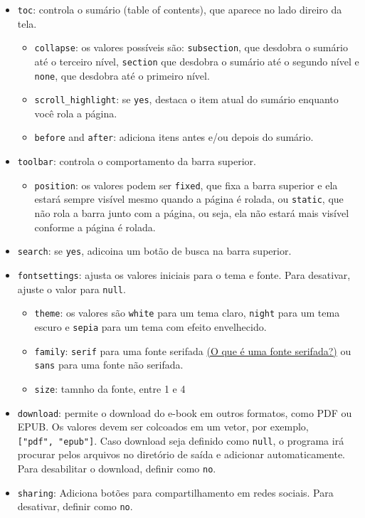\documentclass[
]{book}
\providecommand{\tightlist}{%
  \setlength{\itemsep}{0pt}\setlength{\parskip}{0pt}}
\begin{document}
\begin{itemize}
\tightlist
\item
  \texttt{toc}: controla o sumário (table of contents), que aparece no lado direiro da tela.

  \begin{itemize}
  \tightlist
  \item
    \texttt{collapse}: os valores possíveis são: \texttt{subsection}, que desdobra o sumário até o terceiro nível, \texttt{section} que desdobra o sumário até o segundo nível e \texttt{none}, que desdobra até o primeiro nível.
  \item
    \texttt{scroll\_highlight}: se \texttt{yes}, destaca o item atual do sumário enquanto você rola a página.
  \item
    \texttt{before} and \texttt{after}: adiciona itens antes e/ou depois do sumário.
  \end{itemize}
\item
  \texttt{toolbar}: controla o comportamento da barra superior.

  \begin{itemize}
  \tightlist
  \item
    \texttt{position}: os valores podem ser \texttt{fixed}, que fixa a barra superior e ela estará sempre visível mesmo quando a página é rolada, ou \texttt{static}, que não rola a barra junto com a página, ou seja, ela não estará mais visível conforme a página é rolada.
  \end{itemize}
\item
  \texttt{search}: se \texttt{yes}, adicoina um botão de busca na barra superior.
\item
  \texttt{fontsettings}: ajusta os valores iniciais para o tema e fonte. Para desativar, ajuste o valor para \texttt{null}.

  \begin{itemize}
  \tightlist
  \item
    \texttt{theme}: os valores são \texttt{white} para um tema claro, \texttt{night} para um tema escuro e \texttt{sepia} para um tema com efeito envelhecido.
  \item
    \texttt{family}: \texttt{serif} para uma fonte serifada \href{https://pt.wikipedia.org/wiki/Serifa}{(O que é uma fonte serifada?)} ou \texttt{sans} para uma fonte não serifada.
  \item
    \texttt{size}: tamnho da fonte, entre 1 e 4
  \end{itemize}
\item
  \texttt{download}: permite o download do e-book em outros formatos, como PDF ou EPUB. Os valores devem ser colcoados em um vetor, por exemplo, \texttt{{[}"pdf",\ "epub"{]}}. Caso download seja definido como \texttt{null}, o programa irá procurar pelos arquivos no diretório de saída e adicionar automaticamente. Para desabilitar o download, definir como \texttt{no}.
\item
  \texttt{sharing}: Adiciona botões para compartilhamento em redes sociais. Para desativar, definir como \texttt{no}.


\end{itemize}
\end{document}

